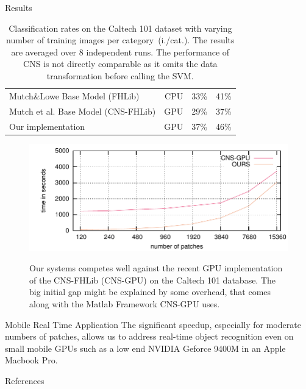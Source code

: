 \documentclass[final]{beamer}
\begin{document}
\begin{frame}{}
\begin{columns}[t]
\begin{column}{.48\linewidth}
\begin{block}{Results}
\begin{table}[t]
\begin{center}
\begin{tabular}{|l|r|r|r|}
      Mutch\&Lowe Base Model (FHLib) \cite{mutch06}      & CPU & 33\% & 41\%\\ %
      Mutch et al. Base Model  (CNS-FHLib) \cite{mutch10} & GPU & 29\%  & 37\%\\ %
      Our implementation                     & GPU & 37\% & 46\%\\
      \hline
    \end{tabular}
        \caption{ Classification rates on the Caltech 101 dataset
      with varying number of training images per category~(i./cat.). 
      The results are averaged over  8 independent runs.  The performance of CNS is not directly
      comparable as it omits the data transformation before calling the SVM.
    }
  \end{center}
\end{table}

\begin{figure}[htb]
  \centering
    \includegraphics[width=\linewidth]{images/PNumTime_max} \\
  \caption{ Our systems competes well against the recent GPU
    implementation of the CNS-FHLib (CNS-GPU) on the Caltech 101 database. 
    The big initial gap might be explained by some overhead, that comes along
    with the Matlab Framework CNS-GPU uses. }
  \label{fig:performance}
\end{figure}
        \end{block}
        
        \begin{block}{Mobile Real Time Application}
        The significant speedup, especially for moderate numbers of patches, allows us to address real-time object recognition even on small mobile GPUs such as a low end NVIDIA Geforce 9400M in an Apple Macbook Pro.      
        \end{block}
        
        \begin{block}{References}
        \tiny
	
	
	\end{block}
	
       \end{column}
    \end{columns}
  \end{frame}
\end{document}
